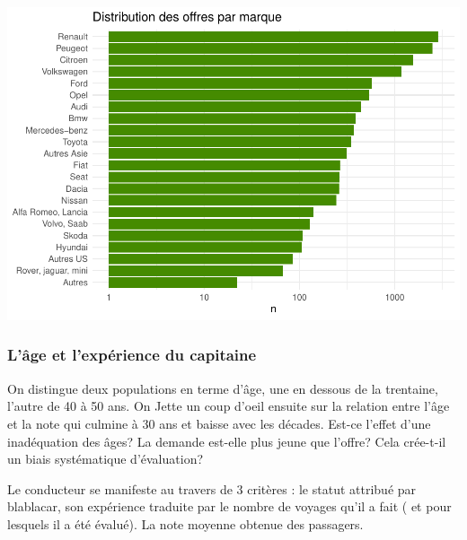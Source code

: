\documentclass[
]{book}
\begin{document}
\includegraphics{bookdown-demo_files/figure-latex/0903-1.pdf}

\hypertarget{luxe2ge-et-lexpuxe9rience-du-capitaine}{%
\subsubsection{L'âge et l'expérience du capitaine}\label{luxe2ge-et-lexpuxe9rience-du-capitaine}}

On distingue deux populations en terme d'âge, une en dessous de la trentaine, l'autre de 40 à 50 ans. On Jette un coup d'oeil ensuite sur la relation entre l'âge et la note qui culmine à 30 ans et baisse avec les décades. Est-ce l'effet d'une inadéquation des âges? La demande est-elle plus jeune que l'offre? Cela crée-t-il un biais systématique d'évaluation?

Le conducteur se manifeste au travers de 3 critères : le statut attribué par blablacar, son expérience traduite par le nombre de voyages qu'il a fait ( et pour lesquels il a été évalué). La note moyenne obtenue des passagers.
\end{document}
